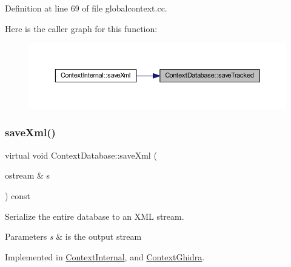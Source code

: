 Definition at line 69 of file globalcontext.\+cc.

Here is the caller graph for this function\+:
\nopagebreak
\begin{figure}[H]
\begin{center}
\leavevmode
\includegraphics[width=350pt]{class_context_database_ab2fb0798b9a7831b68c5c22117d6d2c7_icgraph}
\end{center}
\end{figure}
\mbox{\label{class_context_database_aaf116d099044b04dbcb6d83a079b1836}} 
\subsubsection{\texorpdfstring{saveXml()}{saveXml()}}
{\footnotesize\ttfamily virtual void Context\+Database\+::save\+Xml (\begin{DoxyParamCaption}\item[{ostream \&}]{s }\end{DoxyParamCaption}) const\hspace{0.3cm}{\ttfamily [pure virtual]}}



Serialize the entire database to an X\+ML stream. 


\begin{DoxyParams}{Parameters}
{\em s} & is the output stream \\
\hline
\end{DoxyParams}


Implemented in \mbox{\hyperlink{class_context_internal_a98a632ce5decb052fdf7057d6b6433ed}{Context\+Internal}}, and \mbox{\hyperlink{class_context_ghidra_a8d1d4fb7225ec04dec7b5e3c950e79bb}{Context\+Ghidra}}.


